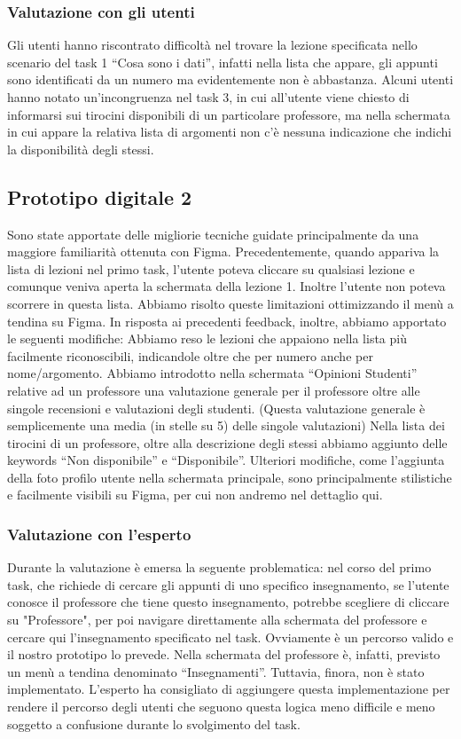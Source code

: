 \subsubsection{Valutazione con gli utenti}
Gli utenti hanno riscontrato difficoltà nel trovare la lezione specificata nello scenario del task 1 “Cosa sono i dati”, infatti nella lista che appare, gli appunti sono identificati da un numero
ma evidentemente non è abbastanza.
Alcuni utenti hanno notato un’incongruenza nel task 3, in cui all’utente viene chiesto di informarsi sui tirocini disponibili di un particolare professore, ma nella schermata in cui appare la relativa
lista di argomenti non c’è nessuna indicazione che indichi la disponibilità degli stessi.

\subsection{Prototipo digitale 2}
Sono state apportate delle migliorie tecniche guidate principalmente da una maggiore familiarità ottenuta con Figma.
Precedentemente, quando appariva la lista di lezioni nel primo task, l’utente poteva cliccare su qualsiasi lezione e comunque veniva aperta la schermata della lezione 1. Inoltre l’utente non poteva
scorrere in questa lista. Abbiamo risolto queste limitazioni ottimizzando il menù a tendina su Figma.
In risposta ai precedenti feedback, inoltre, abbiamo apportato le seguenti modifiche:
Abbiamo reso le lezioni che appaiono nella lista più facilmente riconoscibili, indicandole oltre che per numero anche per nome/argomento.
Abbiamo introdotto nella schermata “Opinioni Studenti” relative ad un professore una valutazione generale per il professore oltre alle singole recensioni e valutazioni degli studenti.
(Questa valutazione generale è semplicemente una media (in stelle su 5) delle singole valutazioni)
Nella lista dei tirocini di un professore, oltre alla descrizione degli stessi abbiamo aggiunto delle keywords “Non disponibile” e “Disponibile”.
Ulteriori modifiche, come l’aggiunta della foto profilo utente nella schermata principale, sono principalmente stilistiche e facilmente visibili su Figma, per cui non andremo nel dettaglio qui.

\subsubsection{Valutazione con l'esperto}
Durante la valutazione è emersa la seguente problematica: nel corso del primo task, che richiede di cercare gli appunti di uno specifico insegnamento, se l’utente conosce il professore che tiene questo
insegnamento, potrebbe scegliere di cliccare su "Professore", per poi navigare direttamente alla schermata del professore e cercare qui l’insegnamento specificato nel task.
Ovviamente è un percorso valido e il nostro prototipo lo prevede. Nella schermata del professore è, infatti, previsto un menù a tendina denominato “Insegnamenti”. Tuttavia, finora, non è stato implementato.
L’esperto ha consigliato di aggiungere questa implementazione per rendere il percorso degli utenti che seguono questa logica meno difficile e meno soggetto a confusione durante lo svolgimento del task.

